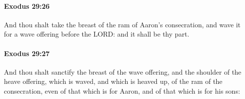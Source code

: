 		\paragraph{Exodus 29:26} %
			\label{EXODUS-29-26}

			And thou shalt take the breast of the ram of Aaron's consecration, and wave it for a wave offering before the LORD: and it shall be thy part.


		\paragraph{Exodus 29:27} %
			\label{EXODUS-29-27}

			And thou shalt sanctify the breast of the wave offering, and the shoulder of the heave offering, which is waved, and which is heaved up, of the ram of the consecration, even of that which is for Aaron, and of that which is for his sons:

